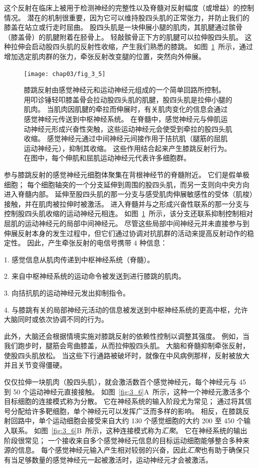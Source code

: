 这个反射在临床上被用于检测神经的完整性以及脊髓对反射幅度（或增益）的控制情况。 
潜在的机制很重要，因为它可以维持股四头肌的正常张力，并防止我们的膝盖在站立或行走时屈曲。 
股四头肌是一块伸展小腿的肌肉，其肌腱通过髌骨（膝盖骨）的肌腱附着在胫骨上。
轻敲髌骨正下方的肌腱可以拉伸股四头肌。 
这种拉伸会启动股四头肌的反射性收缩，产生我们熟悉的膝跳。 
如图~\ref{fig:3_5}~所示，通过增加选定肌肉群的张力，牵张反射改变腿的位置，突然向外伸展。

\begin{figure}[htbp]
	\centering
	\texttt{[image: chap03/fig\_3\_5]}
	\caption{膝跳反射由感觉神经元和运动神经元组成的一个简单回路所控制。
		用叩诊锤轻叩膝盖骨会拉动股四头肌的肌腱，股四头肌是拉伸小腿的肌肉。
		当肌肉因肌腱的牵拉而伸展时，有关肌肉变化的信息会通过感觉神经元传送到中枢神经系统。
		在脊髓中，感觉神经元与伸肌运动神经元形成兴奋性突触，这些运动神经元会使受到牵拉的股四头肌收缩。 
		感觉神经元通过中间神经元间接作用于拮抗肌（腿筋的屈肌运动神经元），抑制其收缩。
		这些作用结合起来产生膝跳反射行为。 
		在图中，每个伸肌和屈肌运动神经元代表许多细胞群。}
	\label{fig:3_5}
\end{figure}


参与膝跳反射的感觉神经元细胞体聚集在背根神经节的脊髓附近。
它们是假单极细胞；
每个细胞轴突的一个分支延伸到周围的股四头肌，而另一支则向中央方向进入脊髓内部。
延伸至股四头肌的那一分支与感受肌肉伸展敏感性的受体（肌梭）接触，并在肌肉被拉伸时被激活。
进入脊髓并与之形成兴奋性联系的那一分支与控制股四头肌收缩的运动神经元相连。
如图~\ref{fig:3_5}~所示，该分支还联系抑制控制相对屈肌的运动神经元的局部中间神经元。 
尽管这些局部中间神经元并未直接参与到伸展反射本身的发生过程中，但它们通过协调对抗肌群的活动来提高反射动作的稳定性。
因此，产生牵张反射的电信号携带 4 种信息：

1. 感觉信息从肌肉传递到中枢神经系统（脊髓）。

2. 来自中枢神经系统的运动命令被发送到进行膝跳的肌肉。

3. 向拮抗肌的运动神经元发出抑制指令。

4. 与膝跳有关的局部神经元活动的信息被发送到中枢神经系统的更高中枢，允许大脑同时或依次协调不同的行为。


此外，大脑还会根据情境实施对膝跳反射的依赖性控制以调整其强度。
例如，当我们跑步时，腿筋会弯曲膝盖，从而拉伸股四头肌。
大脑和脊髓抑制牵张反射，使股四头肌放松。
当这些下行通路被破坏时，就像在中风病例那样，反射被放大并且关节变得僵硬。


仅仅拉伸一块肌肉（股四头肌），就会激活数百个感觉神经元，每个神经元与 45 到 50 个运动神经元直接接触。
如图~\ref{fig:3_6}A~所示，这种一个神经元激活多个目标细胞的连接模式称为分散。 
它在神经系统的输入阶段尤为常见；
通过将其信号分配给许多靶细胞，单个神经元可以发挥广泛而多样的影响。 
相反，在膝跳反射回路中，单个运动细胞会接受来自大约 130 个感觉细胞的大约 200 至 450 个输入联系。
如图~\ref{fig:3_6}B~所示，这种连接模式称为\textit{汇聚}。
它在神经系统的输出阶段很常见；
一个接收来自多个感觉神经元信息的目标运动细胞能够整合多种来源的信息。
每个感觉神经元输入产生相对较弱的兴奋，因此\textit{汇聚}也有助于确保只有当足够数量的感觉神经元一起被激活时，运动神经元才会被激活。


